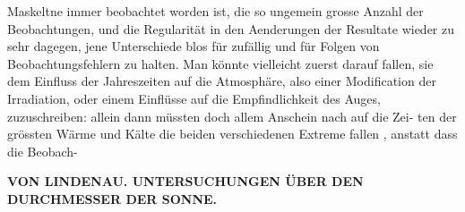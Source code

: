 \documentclass[12pt,a4paper]{article}
\begin{document}
Maskeltne  immer beobachtet  worden  ist,  die  so  ungemein  grosse  Anzahl  der  Beobachtungen,  und  die  Regularität  in  den Aenderungen  der  Resultate  wieder  zu  sehr  dagegen,  jene  Unterschiede  blos  für  zufällig  und  für  Folgen von  Beobachtungsfehlern  zu  halten.  Man  könnte  vielleicht  zuerst  darauf  fallen,  sie  dem  Einfluss  der Jahreszeiten  auf  die  Atmosphäre,  also  einer  Modification  der  Irradiation,  oder  einem  Einflüsse  auf  die Empfindlichkeit  des  Auges,  zuzuschreiben:  allein  dann  müssten  doch  allem  Anschein  nach  auf  die  Zei- ten der  grössten  Wärme  und  Kälte  die  beiden  verschiedenen  Extreme  fallen ,  anstatt  dass  die  Beobach-

\vspace{0.5em}


\noindent\textbf{VON  LINDENAU.     UNTERSUCHUNGEN  ÜBER  DEN  DURCHMESSER  DER  SONNE.}
\end{document}
